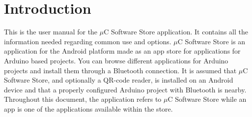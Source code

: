 \chapter{Introduction}
This is the user manual for the $\mu$C Software Store application. It contains all the information needed regarding common use and options. $\mu$C Software Store is an application for the Android platform made as an app store for applications for Arduino based projects. You can browse different applications for Arduino projects and install them through a Bluetooth connection. It is assumed that $\mu$C Software Store, and optionally a QR-code reader, is installed on an Android device and that a properly configured Arduino project with Bluetooth is nearby.\\
\newline
Throughout this document, the application refers to $\mu$C Software Store while an app is one of the applications available within the store.

